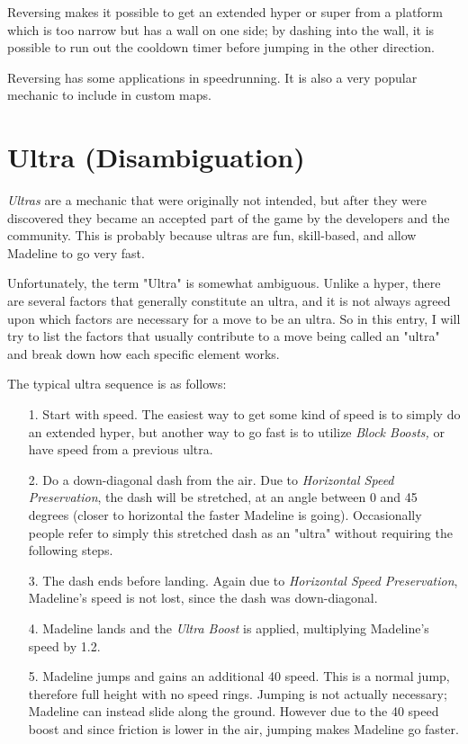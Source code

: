 \documentclass[oneside]{book}
\begin{document}
Reversing makes it possible to get an extended hyper or super from a platform which is too narrow but has a wall on one side; by dashing into the wall, it is possible to run out the cooldown timer before jumping in the other direction.

Reversing has some applications in speedrunning. It is also a very popular mechanic to include in custom maps.

\section{Ultra (Disambiguation)}

\textit{Ultras} are a mechanic that were originally not intended, but after they were discovered they became an accepted part of the game by the developers and the community. This is probably because ultras are fun, skill-based, and allow Madeline to go very fast.

Unfortunately, the term "Ultra" is somewhat ambiguous. Unlike a hyper, there are several factors that generally constitute an ultra, and it is not always agreed upon which factors are necessary for a move to be an ultra. So in this entry, I will try to list the factors that usually contribute to a move being called an "ultra" and break down how each specific element works.

The typical ultra sequence is as follows:

\begin{itemize}
\item[1.]Start with speed. The easiest way to get some kind of speed is to simply do an extended hyper, but another way to go fast is to utilize \textit{Block Boosts,} or have speed from a previous ultra.
\item[2.]Do a down-diagonal dash from the air. Due to \textit{Horizontal Speed Preservation}, the dash will be stretched, at an angle between 0 and 45 degrees (closer to horizontal the faster Madeline is going). Occasionally people refer to simply this stretched dash as an "ultra" without requiring the following steps.
\item[3.]The dash ends before landing. Again due to \textit{Horizontal Speed Preservation}, Madeline's speed is not lost, since the dash was down-diagonal.
\item[4.]Madeline lands and the \textit{Ultra Boost} is applied, multiplying Madeline's speed by 1.2.
\item[5.]Madeline jumps and gains an additional 40 speed. This is a normal jump, therefore full height with no speed rings. Jumping is not actually necessary; Madeline can instead slide along the ground. However due to the 40 speed boost and since friction is lower in the air, jumping makes Madeline go faster.
\end{itemize}
\end{document}
